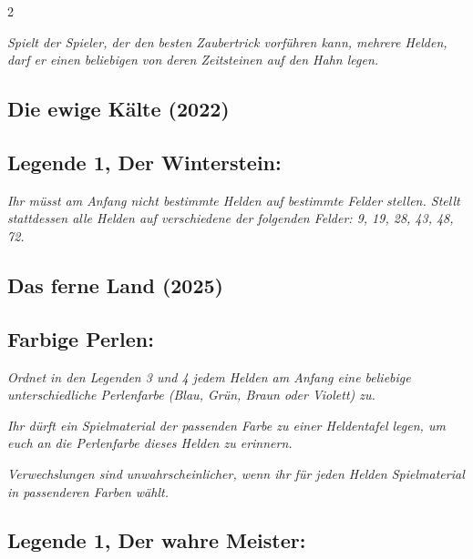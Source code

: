 \documentclass[10pt, a4paper, oneside]{book}
\newcommand{\fan}[1]{\textit{#1}}
\begin{document}
\begin{multicols*}{2}
\begin{nobgcolor}
\fan{Spielt der Spieler, der den besten Zaubertrick vorführen kann, mehrere Helden, darf er einen beliebigen von deren Zeitsteinen auf den Hahn legen.}

\end{nobgcolor}

\begin{bgcolor}
\section{Die ewige Kälte (2022)}



\subsection{Legende 1, Der Winterstein:}


\fan{Ihr müsst am Anfang nicht bestimmte Helden auf bestimmte Felder stellen. Stellt stattdessen alle Helden auf verschiedene der folgenden Felder: 9, 19, 28, 43, 48, 72.}

\end{bgcolor}



\begin{bgcolor}
\section{Das ferne Land (2025)}



\subsection{Farbige Perlen:} 

\fan{Ordnet in den Legenden 3 und 4 jedem Helden am Anfang eine beliebige unterschiedliche Perlenfarbe (Blau, Grün, Braun oder Violett) zu.}

\fan{Ihr dürft ein Spielmaterial der passenden Farbe zu einer Heldentafel legen, um euch an die Perlenfarbe dieses Helden zu erinnern.}

\fan{Verwechslungen sind unwahrscheinlicher, wenn ihr für jeden Helden Spielmaterial in passenderen Farben wählt.}




\subsection{Legende 1, Der wahre Meister:}




\end{bgcolor}
\end{multicols*}
\end{document}
